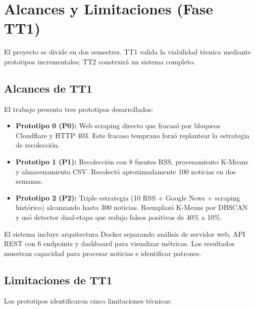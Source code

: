 \section{Alcances y Limitaciones (Fase TT1)}
\label{sec:alcances_limitaciones}

El proyecto se divide en dos semestres. TT1 valida la viabilidad técnica mediante prototipos incrementales; TT2 construirá un sistema completo.

\subsection{Alcances de TT1}
El trabajo presenta tres prototipos desarrollados:

\begin{itemize}
    \item \textbf{Prototipo 0 (P0):} Web scraping directo que fracasó por bloqueos Cloudflare y HTTP 403. Este fracaso temprano forzó replantear la estrategia de recolección.
    
    \item \textbf{Prototipo 1 (P1):} Recolección con 8 fuentes RSS, procesamiento K-Means y almacenamiento CSV. Recolectó aproximadamente  100 noticias en dos semanas.
    
    \item \textbf{Prototipo 2 (P2):} Triple estrategia (10 RSS + Google News + scraping histórico) alcanzando hasta 300 noticias. Reemplazó K-Means por DBSCAN y usó detector dual-etapa que redujo falsos positivos de 40\% a 10\%.
\end{itemize}

El sistema incluye arquitectura Docker separando análisis de servidor web, API REST con 6 endpoints y dashboard para visualizar métricas. Los resultados muestran capacidad para procesar noticias e identificar patrones.

\subsection{Limitaciones de TT1}
Los prototipos identificaron cinco limitaciones técnicas:


